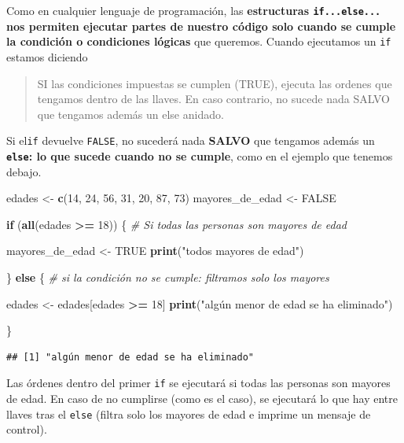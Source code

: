 \documentclass[11pt,]{book}
\newenvironment{Shaded}{\begin{snugshade}}{\end{snugshade}}
\newcommand{\CommentTok}[1]{\textcolor[rgb]{0.37,0.37,0.37}{\textit{#1}}}
\newcommand{\ControlFlowTok}[1]{\textcolor[rgb]{0.27,0.27,0.27}{\textbf{#1}}}
\newcommand{\DecValTok}[1]{\textcolor[rgb]{0.06,0.06,0.06}{#1}}
\newcommand{\KeywordTok}[1]{\textcolor[rgb]{0.27,0.27,0.27}{\textbf{#1}}}
\newcommand{\NormalTok}[1]{#1}
\newcommand{\OperatorTok}[1]{\textcolor[rgb]{0.43,0.43,0.43}{\textbf{#1}}}
\newcommand{\OtherTok}[1]{\textcolor[rgb]{0.37,0.37,0.37}{#1}}
\newcommand{\StringTok}[1]{\textcolor[rgb]{0.5,0.5,0.5}{#1}}
\begin{document}
Como en cualquier lenguaje de programación, las \textbf{estructuras \texttt{if...else...} nos permiten ejecutar partes de nuestro código solo cuando se cumple la condición o condiciones lógicas} que queremos. Cuando ejecutamos un \texttt{if} estamos diciendo

\begin{quote}
SI las condiciones impuestas se cumplen (TRUE), ejecuta las ordenes que tengamos dentro de las llaves. En caso contrario, no sucede nada SALVO que tengamos además un else anidado.
\end{quote}

Si el\texttt{if} devuelve \texttt{FALSE}, no sucederá nada \textbf{SALVO} que tengamos además un \textbf{\texttt{else}: lo que sucede cuando no se cumple}, como en el ejemplo que tenemos debajo.

\begin{Shaded}
\begin{Highlighting}[]
\NormalTok{edades <-}\StringTok{ }\KeywordTok{c}\NormalTok{(}\DecValTok{14}\NormalTok{, }\DecValTok{24}\NormalTok{, }\DecValTok{56}\NormalTok{, }\DecValTok{31}\NormalTok{, }\DecValTok{20}\NormalTok{, }\DecValTok{87}\NormalTok{, }\DecValTok{73}\NormalTok{)}
\NormalTok{mayores_de_edad <-}\StringTok{ }\OtherTok{FALSE} 

\ControlFlowTok{if}\NormalTok{ (}\KeywordTok{all}\NormalTok{(edades }\OperatorTok{>=}\StringTok{ }\DecValTok{18}\NormalTok{)) \{ }\CommentTok{# Si todas las personas son mayores de edad}
  
\NormalTok{  mayores_de_edad <-}\StringTok{ }\OtherTok{TRUE}
  \KeywordTok{print}\NormalTok{(}\StringTok{"todos mayores de edad"}\NormalTok{)}
  
\NormalTok{\} }\ControlFlowTok{else}\NormalTok{ \{ }\CommentTok{# si la condición no se cumple: filtramos solo los mayores}

\NormalTok{  edades <-}\StringTok{ }\NormalTok{edades[edades }\OperatorTok{>=}\StringTok{ }\DecValTok{18}\NormalTok{]  }
  \KeywordTok{print}\NormalTok{(}\StringTok{"algún menor de edad se ha eliminado"}\NormalTok{)}
  
\NormalTok{\}}
\end{Highlighting}
\end{Shaded}

\begin{verbatim}
## [1] "algún menor de edad se ha eliminado"
\end{verbatim}

Las órdenes dentro del primer \texttt{if} se ejecutará si todas las personas son mayores de edad. En caso de no cumplirse (como es el caso), se ejecutará lo que hay entre llaves tras el \texttt{else} (filtra solo los mayores de edad e imprime un mensaje de control).
\end{document}
